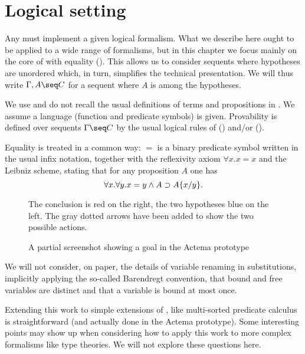 
\section{Logical setting}

Any  must implement a given logical formalism. What we describe here
ought to be applied to a wide range of formalisms, but in this chapter we focus
mainly on the core of   with equality
(). This allows us to consider sequents where hypotheses are
unordered which, in turn, simplifies the technical presentation. We will thus
write $\Gamma,A \seq C$ for a sequent where $A$ is among the hypotheses.

We use and do not recall the usual definitions of terms and propositions in
. We assume a  language (function and predicate
symbols) is given. Provability is defined over sequents $\Gamma\seq C$ by the
usual logical rules of  () and/or
 ().

Equality is treated in a common way: $=$ is a binary
predicate symbol written in the usual infix notation, together with the
reflexivity axiom $\forall x.x=x$ and the Leibniz scheme, stating that for any
proposition $A$ one has
$$\forall x.\forall y. x=y\land A \supset A \{ x / y \}.$$

\begin{figure*}
 \begin{center}
 \end{center}
 The conclusion is red on the right, the two hypotheses blue on the left. The
 gray dotted arrows have been added to show the two possible actions.
 \caption{A partial screenshot showing a goal in the Actema prototype}
 \end{figure*}

We will not consider, on paper, the details of variable renaming in
substitutions, implicitly applying the so-called Barendregt
convention, that bound and free variables are distinct and that a
variable is bound at most once.

Extending this work to simple extensions of , like multi-sorted predicate
calculus is straightforward (and actually done in the Actema prototype). Some
interesting points may show up when considering how to apply this work to more
complex formalisms like type theories. We will not explore these questions here.


